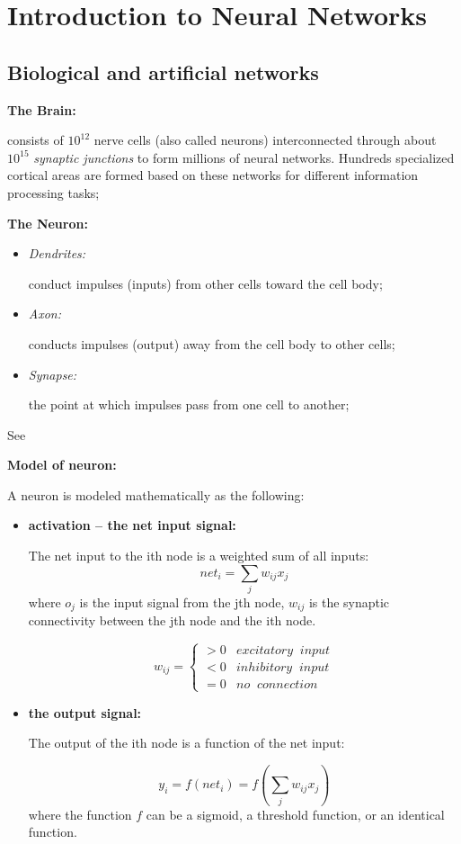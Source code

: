 

\usepackage{html}
\section*{Introduction to Neural Networks}



\subsection*{Biological and artificial networks}

{\bf The Brain:}
	
	consists of $10^{12}$ nerve cells (also called neurons) interconnected 
	through about $10^{15}$ {\em synaptic junctions} to form millions of
	neural networks. Hundreds specialized cortical areas are formed based
	on these networks for different information processing tasks;

{\bf The Neuron:}

	\begin{itemize}
	\item {\em Dendrites:}		

	conduct impulses (inputs) from other cells toward the cell body;
	\item {\em Axon:}

	conducts impulses (output) away from the cell body to other cells; 

	\item {\em Synapse:}

	the point at which impulses pass from one cell to another;

	\end{itemize}

	See 

{\bf Model of neuron:}

	A neuron is modeled mathematically as the following:

	\begin{itemize}
	\item {\bf activation -- the net input signal:}

	The net input to the ith node is a weighted sum of all inputs:
	\[	net_i=\sum_j w_{ij} x_j	\]
	where $o_j$ is the input signal from the jth node, $w_{ij}$ is
	the synaptic connectivity between the jth node and the ith node.

	\[	w_{ij}=\left\{ \begin{array}{ll}
			> 0	& excitatory\;\;input	\\
			< 0	& inhibitory\;\;input	\\
			= 0	& no\;\;connection
			\end{array} \right.
	\]

	\item {\bf the output signal:}

	The output of the ith node is a function of the net input:

	\[ 	y_i=f(net_i)=f(\sum_j w_{ij} x_j)	\]
	where the function $f$ can be a sigmoid, a threshold function,
	or an identical function.

	\end{itemize}

